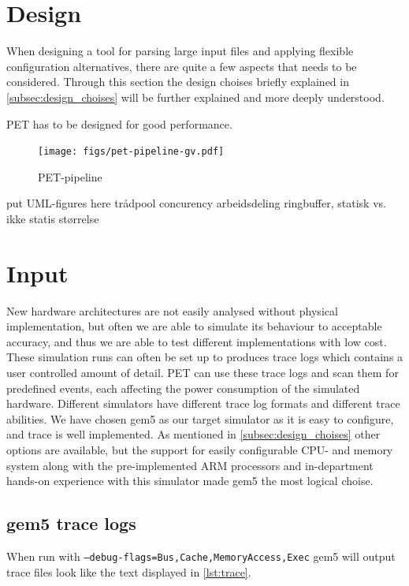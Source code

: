 \section{Design}
When designing a tool for parsing large input files and applying flexible configuration alternatives,
there are quite a few aspects that needs to be considered. Through this section the design choises
briefly explained in \autoref{subsec:design_choises} will be further explained and more deeply understood.

PET has to be designed for good performance.


\begin{figure}
    \texttt{[image: figs/pet-pipeline-gv.pdf]}
    \caption{PET-pipeline}
    \label{fig:pipeline}
\end{figure}

put UML-figures here
trådpool
concurency
arbeidsdeling
ringbuffer, statisk vs. ikke statis størrelse



\section{Input}
New hardware architectures are not easily analysed without physical
implementation, but often we are able to simulate its behaviour to acceptable
accuracy, and thus we are able to test different implementations with low cost.
These simulation runs can often be set up to produces trace logs which contains
a user controlled amount of detail. PET can use these trace logs and scan them
for predefined events, each affecting the power consumption of the simulated
hardware. Different simulators have different trace log formats and different
trace abilities. We have chosen gem5 as our target simulator as it is easy to
configure, and trace is well implemented. As mentioned in
\autoref{subsec:design_choises} other options are available, but the support for
easily configurable CPU- and memory system along with the pre-implemented ARM
processors and in-department hands-on experience with this simulator made gem5
the most logical choise.

\subsection{gem5 trace logs}
When run with \texttt{--debug-flags=Bus,Cache,MemoryAccess,Exec} gem5 will output trace files look like
the text displayed in \autoref{lst:trace}.

